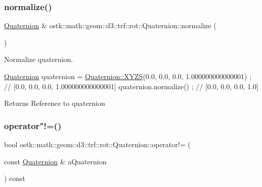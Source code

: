 \subsubsection{\texorpdfstring{normalize()}{normalize()}}
{\footnotesize\ttfamily \hyperlink{classostk_1_1math_1_1geom_1_1d3_1_1trf_1_1rot_1_1_quaternion}{Quaternion} \& ostk\+::math\+::geom\+::d3\+::trf\+::rot\+::\+Quaternion\+::normalize (\begin{DoxyParamCaption}{ }\end{DoxyParamCaption})}



Normalize quaternion. 


\begin{DoxyCode}
\hyperlink{classostk_1_1math_1_1geom_1_1d3_1_1trf_1_1rot_1_1_quaternion_ad9fd7d8eb5effb4d4e0394bbb5bb86dc}{Quaternion} quaternion = \hyperlink{classostk_1_1math_1_1geom_1_1d3_1_1trf_1_1rot_1_1_quaternion_ac57ea57a4033622ed1389101b2e58c76}{Quaternion::XYZS}(0.0, 0.0, 0.0, 1.000000000000001) ; \textcolor{comment}{//
       [0.0, 0.0, 0.0, 1.000000000000001]}
quaternion.normalize() ; \textcolor{comment}{// [0.0, 0.0, 0.0, 1.0]}
\end{DoxyCode}


\begin{DoxyReturn}{Returns}
Reference to quaternion 
\end{DoxyReturn}
\mbox{\label{classostk_1_1math_1_1geom_1_1d3_1_1trf_1_1rot_1_1_quaternion_ad0416f79a44fbd4e9756eea73a83c90c}} 
\subsubsection{\texorpdfstring{operator"!=()}{operator!=()}}
{\footnotesize\ttfamily bool ostk\+::math\+::geom\+::d3\+::trf\+::rot\+::\+Quaternion\+::operator!= (\begin{DoxyParamCaption}\item[{const \hyperlink{classostk_1_1math_1_1geom_1_1d3_1_1trf_1_1rot_1_1_quaternion}{Quaternion} \&}]{a\+Quaternion }\end{DoxyParamCaption}) const}



